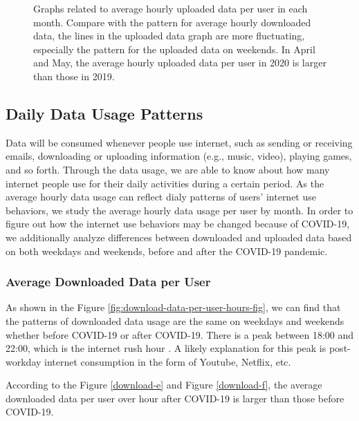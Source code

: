 \begin{figure}[t]
  \caption{Graphs related to average hourly uploaded data per user in each month. Compare with the pattern for average hourly downloaded data, the lines in the uploaded data graph are more fluctuating, especially the pattern for the uploaded data on weekends. In April and May, the average hourly uploaded data per user in 2020 is larger than those in 2019.}
  \label{fig:upload_data_per_user_hours_fig} 
\end{figure}


\subsection{Daily Data Usage Patterns}
Data will be consumed whenever people use internet, such as sending or receiving emails, downloading or uploading information (e.g., music, video), playing games, and so forth.
Through the data usage, we are able to know about how many internet people use for their daily activities during a certain period. As the average hourly data usage can reflect dialy patterns of users’ internet use behaviors, we study the average hourly data usage per user by month. In order to figure out how the internet use behaviors may be changed because of COVID-19, we additionally analyze differences between downloaded and uploaded data based on both weekdays and weekends, before and after the COVID-19 pandemic.

\subsubsection{Average Downloaded Data per User}
\label{sec:download-data-per-user-over-hours}


As shown in the Figure \ref{fig:download-data-per-user-hours-fig}, we can find that the patterns of downloaded data usage are the same on weekdays and weekends whether before COVID-19 or after COVID-19. There is a peak between 18:00 and 22:00, which is the internet rush hour \cite{internetrushhour}. A likely explanation for this peak is post-workday internet consumption in the form of Youtube, Netflix, etc. 

According to the Figure \ref{download-e} and Figure \ref{download-f}, the average downloaded data per user over hour after COVID-19 is larger than those before COVID-19. 

